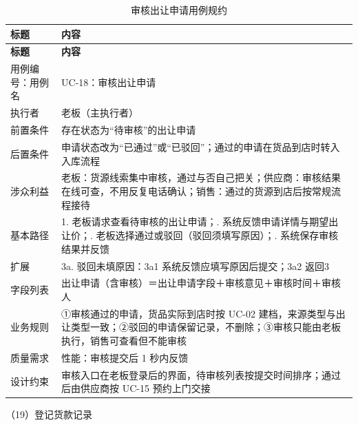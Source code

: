 {\small
\begin{longtable}{@{}L{3.0cm} L{12.3cm}@{}}
\caption{审核出让申请用例规约}\label{tab:uc-18}\\
\toprule
\textbf{标题} & \textbf{内容} \\
\midrule
\endfirsthead
\toprule
\textbf{标题} & \textbf{内容} \\
\midrule
\endhead
用例编号：用例名 & UC-18：审核出让申请 \\
\midrule
执行者 & 老板（主执行者） \\
\midrule
前置条件 & 存在状态为“待审核”的出让申请 \\
\midrule
后置条件 & 申请状态改为“已通过”或“已驳回”；通过的申请在货品到店时转入入库流程 \\
\midrule
涉众利益 & 老板：货源线索集中审核，通过与否自己把关；\newline 供应商：审核结果在线可查，不用反复电话确认；\newline 销售：通过的货源到店后按常规流程接待 \\
\midrule
基本路径 & 1. 老板请求查看待审核的出让申请；. 系统反馈申请详情与期望出让价；. 老板选择通过或驳回（驳回须填写原因）；. 系统保存审核结果并反馈 \\
\midrule
扩展 & 3a. 驳回未填原因：3a1 系统反馈应填写原因后提交；3a2 返回3 \\
\midrule
字段列表 & 出让申请（含审核）＝出让申请字段＋审核意见＋审核时间＋审核人 \\
\midrule
业务规则 & ①审核通过的申请，货品实际到店时按 UC-02 建档，来源类型与出让类型一致；\newline ②驳回的申请保留记录，不删除；\newline ③审核只能由老板执行，销售可查看但不能审核 \\
\midrule
质量需求 & 性能：审核提交后 1 秒内反馈 \\
\midrule
设计约束 & 审核入口在老板登录后的界面，待审核列表按提交时间排序；通过后由供应商按 UC-15 预约上门交接 \\
\midrule
\bottomrule
\end{longtable}}

\noindent（19）登记货款记录

